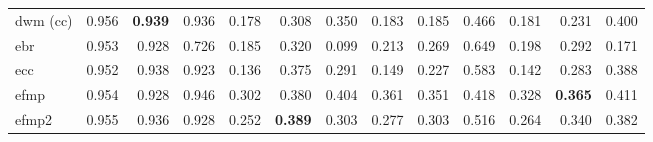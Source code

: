 \begin{tabular}{l:rrr:rrr:rrr:rrr}
	\acrshort{dwm} (\acrshort{cc})          & 0.956
	                                        & \textbf{0.939}                             & 0.936          & 0.178 & 0.308 & 0.350          & 0.183 & 0.185          & 0.466 & 0.181 & 0.231 & 0.400         \\
	\acrshort{ebr}                          & 0.953                                      & 0.928          & 0.726 & 0.185 & 0.320          & 0.099 & 0.213          & 0.269 & 0.649 & 0.198 & 0.292 & 0.171 \\
	\acrshort{ecc}                          & 0.952                                      & 0.938          & 0.923 & 0.136 & 0.375          & 0.291 & 0.149          & 0.227 & 0.583 & 0.142 & 0.283 & 0.388 \\
	\hline
	\acrshort{efmp}                         & 0.954
	                                        & 0.928                                      & 0.946          &
	0.302                                   & 0.380                                      & 0.404          & 0.361 & 0.351 & 0.418          & 0.328 & \textbf{0.365} & 0.411                                 \\
	\acrshort{efmp2}                        & 0.955
	                                        & 0.936                                      & 0.928          & 0.252 &
	\textbf{0.389}                          & 0.303                                      & 0.277          & 0.303 & 0.516 & 0.264          & 0.340 & 0.382                                                  \\
	\bottomrule
\end{tabular}
